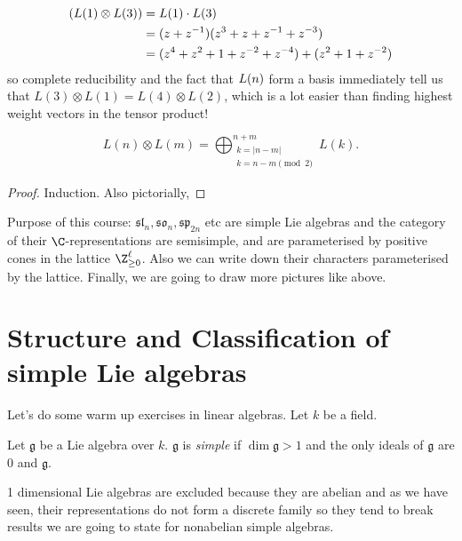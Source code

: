 \documentclass[a4paper]{article}
\newcommand*{\Lie}[1]{\mathfrak{#1}} %
\let\ch\relax
\DeclareMathOperator{\ch}{ch} %
\begin{document}
\begin{eg}
  \begin{align*}
    \ch (L(1) \otimes L(3))
    &= \ch L(1) \cdot \ch L(3) \\
    &= (z + z^{-1})(z^3 + z + z^{-1} + z^{-3}) \\
    &= (z^4 + z^2 + 1 + z^{-2} + z^{-4}) + (z^2 + 1 + z^{-2})
  \end{align*}
  so complete reducibility and the fact that \(\ch L(n)\) form a basis immediately tell us that \(L(3) \otimes L(1) = L(4) \otimes L(2)\), which is a lot easier than finding highest weight vectors in the tensor product!
\end{eg}

\begin{corollary}
  \[
    L(n) \otimes L(m) = \bigoplus_{\substack{k = |n - m| \\ k = n - m \pmod 2}}^{n + m} L(k).
  \]
\end{corollary}

\begin{proof}
  Induction. Also pictorially,
\end{proof}

Purpose of this course: \(\Lie{sl}_n, \Lie{so}_n, \Lie{sp}_{2n}\) etc are simple Lie algebras and the category of their \(\C\)-representations are semisimple, and are parameterised by positive cones in the lattice \(\Z_{\geq 0}^\ell\). Also we can write down their characters parameterised by the lattice. Finally, we are going to draw more pictures like above.

\section{Structure and Classification of simple Lie algebras}

Let's do some warm up exercises in linear algebras. Let \(k\) be a field.

\begin{definition}
  Let \(\Lie g\) be a Lie algebra over \(k\). \(\Lie g\) is \emph{simple} if \(\dim \Lie g > 1\) and the only ideals of \(\Lie g\) are \(0\) and \(\Lie g\).
\end{definition}

1 dimensional Lie algebras are excluded because they are abelian and as we have seen, their representations do not form a discrete family so they tend to break results we are going to state for nonabelian simple algebras.
\end{document}
